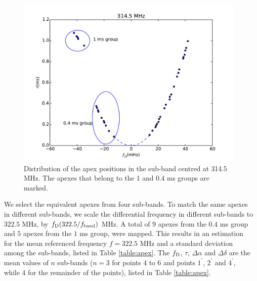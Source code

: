 \documentclass[useAMS,usenatbib]{mn2e}
\begin{document}
\begin{figure}
\centering
\includegraphics[width=\linewidth]{apex_pos.pdf}
\caption{Distribution of the apex positions in the sub-band centred at
  314.5 MHz.  The apexes that belong to the 1 and 0.4 ms groups are marked.}
\label{fig:apex_pos}
\end{figure}

We select the equivalent apexes from four sub-bands.  To match the same apexes in different sub-bands, we scale the differential frequency in different sub-bands to $322.5$ MHz, by $f_{\rm D} (322.5/f_{\rm band})$ MHz.  A total of $9$ apexes from the $0.4$ ms group and $5$ apexes from the $1$ ms
group, were mapped.  This results in an estimation
for the mean referenced frequency $f=322.5$ MHz and a standard
deviation among the sub-bands, listed in Table
\ref{table:apex}.  The $f_{\rm D}$, $\tau$, $\Delta\alpha$ and $\Delta\delta$
are the mean values of $n$ sub-bands
($n=3$ for points 4 to 6 and points $1^\prime$, $2^\prime$ and $4^\prime$, while 4 for the remainder of the points), listed
in Table \ref{table:apex}. 
\end{document}
